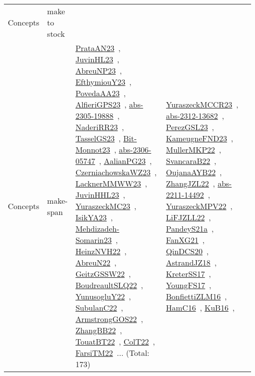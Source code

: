 {\begin{longtable}{lp{3cm}>{\raggedright\arraybackslash}p{6cm}>{\raggedright\arraybackslash}p{6cm}>{\raggedright\arraybackslash}p{8cm}}
Concepts & make to stock &  &  & \\
Concepts & make-span & \href{works/PrataAN23.pdf}{PrataAN23}~\cite{PrataAN23}, \href{works/JuvinHL23.pdf}{JuvinHL23}~\cite{JuvinHL23}, \href{works/AbreuNP23.pdf}{AbreuNP23}~\cite{AbreuNP23}, \href{works/EfthymiouY23.pdf}{EfthymiouY23}~\cite{EfthymiouY23}, \href{works/PovedaAA23.pdf}{PovedaAA23}~\cite{PovedaAA23}, \href{works/AlfieriGPS23.pdf}{AlfieriGPS23}~\cite{AlfieriGPS23}, \href{works/abs-2305-19888.pdf}{abs-2305-19888}~\cite{abs-2305-19888}, \href{works/NaderiRR23.pdf}{NaderiRR23}~\cite{NaderiRR23}, \href{works/TasselGS23.pdf}{TasselGS23}~\cite{TasselGS23}, \href{works/Bit-Monnot23.pdf}{Bit-Monnot23}~\cite{Bit-Monnot23}, \href{works/abs-2306-05747.pdf}{abs-2306-05747}~\cite{abs-2306-05747}, \href{works/AalianPG23.pdf}{AalianPG23}~\cite{AalianPG23}, \href{works/CzerniachowskaWZ23.pdf}{CzerniachowskaWZ23}~\cite{CzerniachowskaWZ23}, \href{works/LacknerMMWW23.pdf}{LacknerMMWW23}~\cite{LacknerMMWW23}, \href{works/JuvinHHL23.pdf}{JuvinHHL23}~\cite{JuvinHHL23}, \href{works/YuraszeckMC23.pdf}{YuraszeckMC23}~\cite{YuraszeckMC23}, \href{works/IsikYA23.pdf}{IsikYA23}~\cite{IsikYA23}, \href{works/Mehdizadeh-Somarin23.pdf}{Mehdizadeh-Somarin23}~\cite{Mehdizadeh-Somarin23}, \href{works/HeinzNVH22.pdf}{HeinzNVH22}~\cite{HeinzNVH22}, \href{works/AbreuN22.pdf}{AbreuN22}~\cite{AbreuN22}, \href{works/GeitzGSSW22.pdf}{GeitzGSSW22}~\cite{GeitzGSSW22}, \href{works/BoudreaultSLQ22.pdf}{BoudreaultSLQ22}~\cite{BoudreaultSLQ22}, \href{works/YunusogluY22.pdf}{YunusogluY22}~\cite{YunusogluY22}, \href{works/SubulanC22.pdf}{SubulanC22}~\cite{SubulanC22}, \href{works/ArmstrongGOS22.pdf}{ArmstrongGOS22}~\cite{ArmstrongGOS22}, \href{works/ZhangBB22.pdf}{ZhangBB22}~\cite{ZhangBB22}, \href{works/TouatBT22.pdf}{TouatBT22}~\cite{TouatBT22}, \href{works/ColT22.pdf}{ColT22}~\cite{ColT22}, \href{works/FarsiTM22.pdf}{FarsiTM22}~\cite{FarsiTM22}... (Total: 173) & \href{works/YuraszeckMCCR23.pdf}{YuraszeckMCCR23}~\cite{YuraszeckMCCR23}, \href{works/abs-2312-13682.pdf}{abs-2312-13682}~\cite{abs-2312-13682}, \href{works/PerezGSL23.pdf}{PerezGSL23}~\cite{PerezGSL23}, \href{works/KameugneFND23.pdf}{KameugneFND23}~\cite{KameugneFND23}, \href{works/MullerMKP22.pdf}{MullerMKP22}~\cite{MullerMKP22}, \href{works/SvancaraB22.pdf}{SvancaraB22}~\cite{SvancaraB22}, \href{works/OujanaAYB22.pdf}{OujanaAYB22}~\cite{OujanaAYB22}, \href{works/ZhangJZL22.pdf}{ZhangJZL22}~\cite{ZhangJZL22}, \href{works/abs-2211-14492.pdf}{abs-2211-14492}~\cite{abs-2211-14492}, \href{works/YuraszeckMPV22.pdf}{YuraszeckMPV22}~\cite{YuraszeckMPV22}, \href{works/LiFJZLL22.pdf}{LiFJZLL22}~\cite{LiFJZLL22}, \href{works/PandeyS21a.pdf}{PandeyS21a}~\cite{PandeyS21a}, \href{works/FanXG21.pdf}{FanXG21}~\cite{FanXG21}, \href{works/QinDCS20.pdf}{QinDCS20}~\cite{QinDCS20}, \href{works/AstrandJZ18.pdf}{AstrandJZ18}~\cite{AstrandJZ18}, \href{works/KreterSS17.pdf}{KreterSS17}~\cite{KreterSS17}, \href{works/YoungFS17.pdf}{YoungFS17}~\cite{YoungFS17}, \href{works/BonfiettiZLM16.pdf}{BonfiettiZLM16}~\cite{BonfiettiZLM16}, \href{works/HamC16.pdf}{HamC16}~\cite{HamC16}, \href{works/KuB16.pdf}{KuB16}~\cite{KuB16}, 
\end{longtable}}

